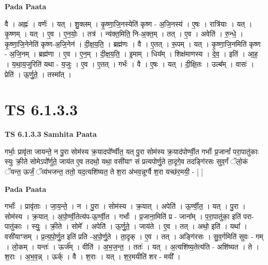 \documentclass[17pt]{extarticle}
\begin{document}
\textbf{Pada Paata} \newline

वै । अह्नः॑ । वर्णः॑ । यत् । शु॒क्लम् । कृ॒ष्णा॒जि॒नस्येति॑ कृष्ण - अ॒जि॒नस्य॑ । ए॒षः । रात्रि॑याः । यत् । कृ॒ष्णम् । यत् । ए॒व । ए॒न॒योः॒ । तत्र॑ । न्य॑क्त॒मिति॒ नि-अ॒क्त॒म् । तत् । ए॒व । अवेति॑ । रु॒न्धे॒ । कृ॒ष्णा॒जि॒नेनेति॑ कृष्ण-अ॒जि॒नेन॑ । दी॒क्ष॒य॒ति॒ । ब्रह्म॑णः । वै । ए॒तत् । रू॒पम् । यत् । कृ॒ष्णा॒जि॒नमिति॑ कृष्ण - अ॒जि॒नम् । ब्रह्म॑णा । ए॒व । ए॒न॒म् । दी॒क्ष॒य॒ति॒ । इ॒माम् । धिय᳚म् । शिक्ष॑माणस्य । दे॒व॒ । इति॑ । आ॒ह॒ । य॒था॒य॒जुरिति॑ यथा - य॒जुः । ए॒व । ए॒तत् । गर्भः॑ । वै । ए॒षः । यत् । दी॒क्षि॒तः । उल्ब᳚म् । वासः॑ । प्रेति॑ । ऊ॒र्णु॒ते॒ । तस्मा᳚त् ।  \newline




\section*{ TS 6.1.3.3 }

\textbf{TS 6.1.3.3 } \newline
\textbf{Samhita Paata} \newline

गर्भाः॒ प्रावृ॑ता जायन्ते॒ न पु॒रा सोम॑स्य क्र॒यादपो᳚र्ण्वीत॒ यत् पु॒रा सोम॑स्य क्र॒याद॑पोर्ण्वी॒त गर्भाः᳚ प्र॒जानां᳚ परा॒पातु॑काः स्युः क्री॒ते सोमेऽपो᳚र्णुते॒ जाय॑त ए॒व तदथो॒ यथा॒ वसी॑याꣳ सं प्रत्यपोर्णु॒ते ता॒दृगे॒व तदङ्गि॑रसः सुव॒र्गं ॅलो॒कं ॅयन्त॒ ऊर्जं॒ ॅव्य॑भजन्त॒ ततो॒ यद॒त्यशि॑ष्यत॒ ते श॒रा अ॑भव॒न्नूर्ग्वै श॒रा यच्छ॑र॒मयी॒ - [  ] \newline

\textbf{Pada Paata} \newline

गर्भाः᳚ । प्रावृ॑ताः । जा॒य॒न्ते॒ । न । पु॒रा । सोम॑स्य । क्र॒यात् । अपेति॑ । ऊ॒र्ण्वी॒त॒ । यत् । पु॒रा । सोम॑स्य । क्र॒यात् । अ॒पो॒र्ण्वी॒तेत्य॑प-ऊ॒र्ण्वी॒त । गर्भाः᳚ । प्र॒जाना॒मिति॑ प्र - जाना᳚म् । प॒रा॒पातु॑का॒ इति॑ परा-पातु॑काः । स्युः॒ । क्री॒ते । सोमे᳚ । अपेति॑ । ऊ॒र्णु॒ते॒ । जाय॑ते । ए॒व । तत् । अथो॒ इति॑ । यथा᳚ । वसी॑याꣳसम् । प्र॒त्य॒पो॒र्णु॒त इति॑ प्रति -अ॒पो॒र्णु॒ते । ता॒दृक् । ए॒व । तत् । अङ्गि॑रसः । सु॒व॒र्गमिति॑ सुवः - गम् । लो॒कम् । यन्तः॑ । ऊर्ज᳚म् । वीति॑ । अ॒भ॒ज॒न्त॒ । ततः॑ । यत् । अ॒त्यशि॑ष्य॒तेत्य॑ति - अशि॑ष्यत । ते । श॒राः । अ॒भ॒व॒न्न् । ऊर्क् । वै । श॒राः । यत् । श॒र॒मयीति॑ शर - मयी᳚ ।  \newline
\end{document}
